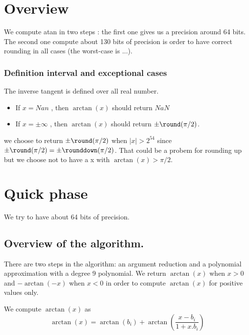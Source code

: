 \newcommand{\xred}{X_{\mathrm{red}}}
\newcommand{\xredhi}{X_{\mathrm{red hi}}}
\newcommand{\xredlo}{X_{\mathrm{red lo}}}

\section{Overview}

We compute atan in two steps : the first one gives us a precision around 64
bits. The second one compute about 130 bits of precision is order to have
correct rounding in all cases (the worst-case is ...).

\subsubsection{Definition interval and exceptional cases}

The inverse tangent is defined over all real number.

\begin{itemize}
\item If $x = Nan$ , then $\arctan(x)$ should return $NaN$
\item If $x = \pm\infty$ , then $\arctan(x)$ should return
$\pm\round(\pi/2)$. 
\end{itemize}
we choose to return $\pm\round(\pi/2)$ when $|x|>2^{54}$ since
$\pm\round(\pi/2) =\pm\rounddown(\pi/2) $. That could be a probem for
rounding up but we choose not to have a x with $\arctan(x) > \pi/2$.
\section{Quick phase}

We try to have about 64 bits of precision.

\subsection{Overview of the algorithm.}

There are two steps in the algorithm: an argument reduction and a polynomial
approximation with a degree 9 polynomial. We return $\arctan(x)$ when
$x>0$ and $-\arctan(-x)$ when $x<0$ in order to compute $\arctan(x)$ for positive
values only.

We compute $\arctan(x)$ as 
\begin{equation}
\arctan(x) = \arctan( b_i ) + \arctan(\frac{x-b_i}{1+x.b_i}) \label{eq:arctan_redu}
\end{equation}

